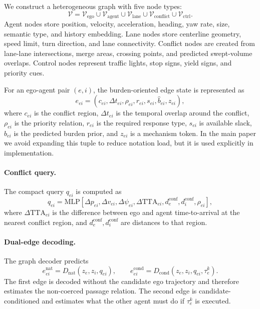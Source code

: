 \documentclass[10pt]{article}
\begin{document}
We construct a heterogeneous graph with five node types:
\begin{equation}
    \mathcal{V}
    =
    \mathcal{V}_{\mathrm{ego}}
    \cup
    \mathcal{V}_{\mathrm{agent}}
    \cup
    \mathcal{V}_{\mathrm{lane}}
    \cup
    \mathcal{V}_{\mathrm{conflict}}
    \cup
    \mathcal{V}_{\mathrm{ctrl}} .
\end{equation}
Agent nodes store position, velocity, acceleration, heading, yaw rate, size, semantic type, and history embedding. Lane nodes store centerline geometry, speed limit, turn direction, and lane connectivity. Conflict nodes are created from lane-lane intersections, merge areas, crossing points, and predicted swept-volume overlaps. Control nodes represent traffic lights, stop signs, yield signs, and priority cues.

For an ego-agent pair $(e,i)$, the burden-oriented edge state is represented as
\begin{equation}
    e_{ei}
    =
    (
    c_{ei},
    \Delta t_{ei},
    \rho_{ei},
    r_{ei},
    s_{ei},
    \widehat{b}_{ei},
    z_{ei}
    ),
\end{equation}
where $c_{ei}$ is the conflict region, $\Delta t_{ei}$ is the temporal overlap around the conflict, $\rho_{ei}$ is the priority relation, $r_{ei}$ is the required response type, $s_{ei}$ is available slack, $\widehat{b}_{ei}$ is the predicted burden prior, and $z_{ei}$ is a mechanism token. In the main paper we avoid expanding this tuple to reduce notation load, but it is used explicitly in implementation.

\paragraph{Conflict query.}
The compact query $q_{ei}$ is computed as
\begin{equation}
    q_{ei}
    =
    \mathrm{MLP}
    \left[
    \Delta p_{ei},
    \Delta v_{ei},
    \Delta \psi_{ei},
    \Delta \mathrm{TTA}_{ei},
    d^{\mathrm{conf}}_{e},
    d^{\mathrm{conf}}_{i},
    \rho_{ei}
    \right],
\end{equation}
where $\Delta \mathrm{TTA}_{ei}$ is the difference between ego and agent time-to-arrival at the nearest conflict region, and $d^{\mathrm{conf}}_e,d^{\mathrm{conf}}_i$ are distances to that region.

\paragraph{Dual-edge decoding.}
The graph decoder predicts
\begin{equation}
    e^{\mathrm{nat}}_{ei}
    =
    D_{\mathrm{nat}}(z_e,z_i,q_{ei}),
    \qquad
    e^{\mathrm{cond}}_{ei}
    =
    D_{\mathrm{cond}}(z_e,z_i,q_{ei},\tau^k_e).
\end{equation}
The first edge is decoded without the candidate ego trajectory and therefore estimates the non-coerced passage relation. The second edge is candidate-conditioned and estimates what the other agent must do if $\tau^k_e$ is executed.
\end{document}
